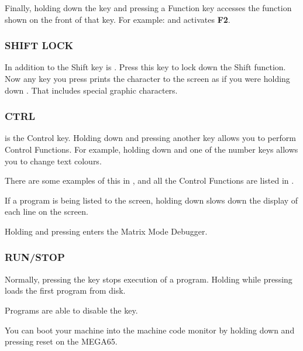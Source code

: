 Finally, holding down the  key and pressing a Function key accesses the function shown on the front of that key. For example:  and  activates \textbf{F2}.


\subsubsection{SHIFT LOCK}

In addition to the Shift key is . Press this key to lock down the Shift function. Now any key you press prints the character to the screen as if you were holding down . That includes special graphic characters.

\subsubsection{CTRL}

 is the Control key. Holding down  and pressing another key allows you to perform Control Functions. For example, holding down  and one of the number keys allows you to change text colours.

There are some examples of this in , and all the Control Functions are listed in .

If a program is being listed to the screen, holding down  slows down the display of each line on the screen.

Holding  and pressing \megakey{*} enters the Matrix Mode Debugger.

\subsubsection{RUN/STOP}

Normally, pressing the  key stops execution of a program. Holding  while pressing  loads the first program from disk.

Programs are able to disable the  key.

You can boot your machine into the machine code monitor by holding down  and pressing reset on the MEGA65.


